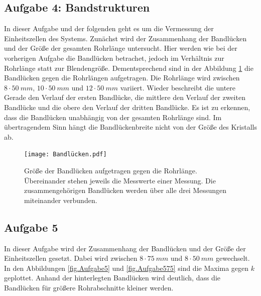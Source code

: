 \subsection{Aufgabe 4: Bandstrukturen}
In dieser Aufgabe und der folgenden geht es um die Vermessung der Einheitszellen des Systems.
Zunächst wird der Zusammenhang der Bandlücken und der Größe der gesamten Rohrlänge untersucht.
Hier werden wie bei der vorherigen Aufgabe die Bandlücken betrachet, jedoch im Verhältnis zur Rohrlänge statt zur Blendengröße.
Dementsprechend sind in der Abbildung \ref{fig.Aufgabe4} die Bandlücken gegen die Rohrlängen aufgetragen.
Die Rohrlänge wird zwischen $8 \cdot \SI{50}{mm}$, $10 \cdot \SI{50}{mm}$ und $12 \cdot \SI{50}{mm}$ variiert.
Wieder beschreibt die untere Gerade den Verlauf der ersten Bandlücke, die mittlere den Verlauf der zweiten Bandlücke und die obere den Verlauf der dritten Bandlücke.
Es ist zu erkennen, dass die Bandlücken unabhängig von der gesamten Rohrlänge sind.
Im übertragendem Sinn hängt die Bandlückenbreite nicht von der Größe des Kristalls ab.
\begin{figure}[h!]
  \centering
  \texttt{[image: Bandlücken.pdf]}
  \caption{Größe der Bandlücken aufgetragen gegen die Rohrlänge. Übereinander stehen jeweils die Messwerte einer Messung. Die zusammengehörigen Bandlücken werden über alle drei Messungen miteinander verbunden.}
  \label{fig.Aufgabe4}
\end{figure}
\FloatBarrier

\subsection{Aufgabe 5}
In dieser Aufgabe wird der Zusammenhang der Bandlücken und der Größe der Einheitszellen gesetzt.
Dabei wird zwischen $8 \cdot \SI{75}{mm}$ und $8 \cdot \SI{50}{mm}$ gewechselt.
In den Abbildungen \ref{fig.Aufgabe5} und \ref{fig.Aufgabe575} sind die Maxima gegen $k$ geplottet. Anhand der hinterlegten Bandlücken wird deutlich, dass die Bandlücken für größere Rohrabschnitte kleiner werden.

